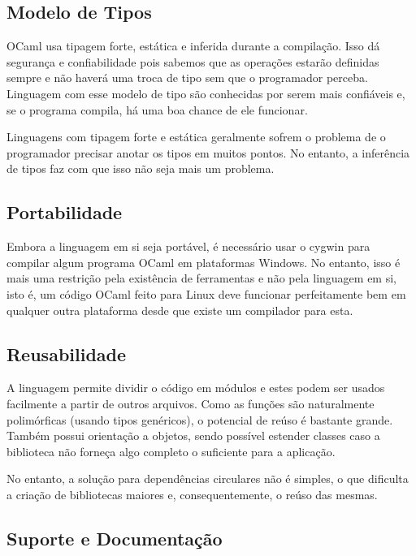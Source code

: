 \documentclass[a4paper,10pt]{article}
\begin{document}
	\subsection{Modelo de Tipos}
		
		OCaml usa tipagem forte, estática e inferida durante a compilação. Isso dá segurança e confiabilidade pois sabemos que as operações estarão definidas sempre e não haverá uma troca de tipo sem que o programador perceba. Linguagem com esse modelo de tipo são conhecidas por serem mais confiáveis e, se o programa compila, há uma boa chance de ele funcionar.
		
		Linguagens com tipagem forte e estática geralmente sofrem o problema de o programador precisar anotar os tipos em muitos pontos. No entanto, a inferência de tipos faz com que isso não seja mais um problema.
		
	\subsection{Portabilidade}
		
		Embora a linguagem em si seja portável, é necessário usar o cygwin para compilar algum programa OCaml em plataformas Windows. No entanto, isso é mais uma restrição pela existência de ferramentas e não pela linguagem em si, isto é, um código OCaml feito para Linux deve funcionar perfeitamente bem em qualquer outra plataforma desde que existe um compilador para esta.
		
	\subsection{Reusabilidade}
	
		A linguagem permite dividir o código em módulos e estes podem ser usados facilmente a partir de outros arquivos. Como as funções são naturalmente polimórficas (usando tipos genéricos), o potencial de reúso é bastante grande. Também possui orientação a objetos, sendo possível estender classes caso a biblioteca não forneça algo completo o suficiente para a aplicação.
		
		No entanto, a solução para dependências circulares não é simples, o que dificulta a criação de bibliotecas maiores e, consequentemente, o reúso das mesmas.
	
	\subsection{Suporte e Documentação}
	
\end{document}
